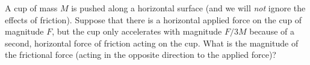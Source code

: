 A cup of mass $M$ is pushed along a horizontal surface (and we will
\emph{not} ignore the effects of friction). Suppose that there is a
horizontal applied force on the cup of magnitude $F$, but the cup
only accelerates with magnitude $F/3M$ because of a second,
horizontal force of friction acting on the cup. What is the magnitude
of the frictional force (acting in the opposite direction to the
applied force)?
